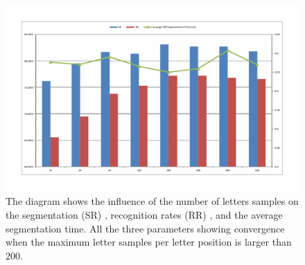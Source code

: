 \documentclass[10pt, conference, compsocconf]{IEEEtran}
\begin{document}
\begin{figure}
\centering
\includegraphics[width=1\columnwidth]{./figures/num_letter_impact}
\caption{The diagram shows the influence of the number of letters samples on the segmentation (SR) , recognition rates (RR) , and the average segmentation time. All the three parameters showing convergence when the maximum letter samples per letter position is larger than 200. }
\label{fig:num_letter_impact}
\end{figure}



\end{document}
